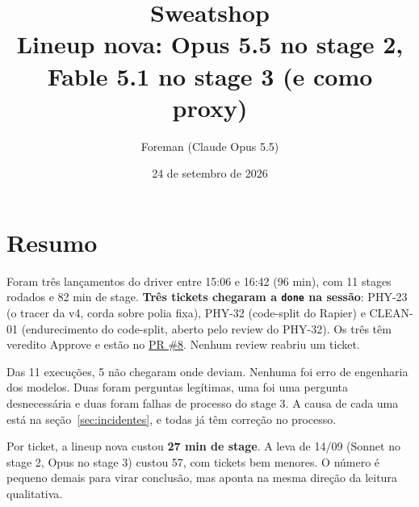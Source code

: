 \documentclass[11pt,a4paper]{article}
\title{Sweatshop \tk{2026-09-24-1506}\\[2pt]\large Lineup nova: Opus 5.5 no stage 2, Fable 5.1 no stage 3 (e como proxy)}
\author{Foreman (Claude Opus 5.5)}
\date{24 de setembro de 2026}
\newcommand{\tk}[1]{\texttt{#1}}
\begin{document}
\maketitle

\section*{Resumo}
Foram três lançamentos do driver entre 15:06 e 16:42 (96 min), com 11 stages rodados e 82 min de stage.
\textbf{Três tickets chegaram a \tk{done} na sessão}: PHY-23 (o tracer da v4, corda sobre polia fixa), PHY-32 (code-split do Rapier) e CLEAN-01 (endurecimento do code-split, aberto pelo review do PHY-32).
Os três têm veredito Approve e estão no \href{https://github.com/Laginho/PhysiSyst/pull/8}{PR \#8}.
Nenhum review reabriu um ticket.

Das 11 execuções, 5 não chegaram onde deviam.
Nenhuma foi erro de engenharia dos modelos.
Duas foram perguntas legítimas, uma foi uma pergunta desnecessária e duas foram falhas de processo do stage 3.
A causa de cada uma está na seção~\ref{sec:incidentes}, e todas já têm correção no processo.

Por ticket, a lineup nova custou \textbf{27 min de stage}.
A leva de 14/09 (Sonnet no stage 2, Opus no stage 3) custou 57, com tickets bem menores.
O número é pequeno demais para virar conclusão, mas aponta na mesma direção da leitura qualitativa.
\end{document}
